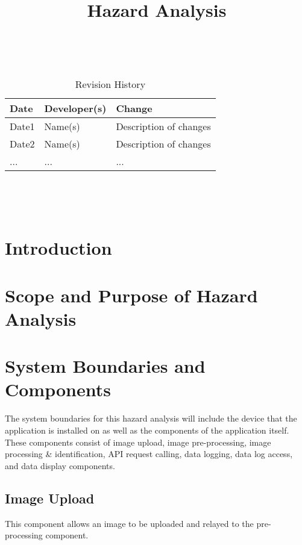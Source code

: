 \documentclass{article}
\title{Hazard Analysis\\\progname}
\author{\authname}
\date{}
\begin{document}
	
\maketitle
\thispagestyle{empty}

~\newpage


\begin{table}[hp]
	\caption{Revision History} \label{TblRevisionHistory}
	\begin{tabularx}{\textwidth}{llX}
		\toprule
		\textbf{Date} & \textbf{Developer(s)} & \textbf{Change}\\
		\midrule
		Date1 & Name(s) & Description of changes\\
		Date2 & Name(s) & Description of changes\\
		... & ... & ...\\
		\bottomrule
	\end{tabularx}
\end{table}

~\newpage

\tableofcontents

~\newpage



\section{Introduction}


\section{Scope and Purpose of Hazard Analysis}

\section{System Boundaries and Components}
The system boundaries for this hazard analysis will include the device that the application is installed on as well as the components of the application itself. These components consist of image upload, image pre-processing, image processing \& identification, API request calling, data logging, data log access, and data display components.

\subsection{Image Upload}
This component allows an image to be uploaded and relayed to the pre-processing component.
\end{document}
